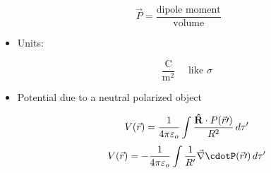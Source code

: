\begin{itemize}
    $$\vec{P}=\frac{\text{dipole moment}}{\text{volume}}$$

    \begin{itemize}

      \item Units:

        $$\frac{\si{\coulomb}}{\si{\meter\squared}}\quad\text{ like }\sigma$$

      \item Potential due to a neutral polarized object

        $$V(\vec{r})=\frac{1}{4\pi\varepsilon_o}\int\frac{\bold{\hat{R}}\cdot P(\vec{r}\prime)}{R^2}\,d\tau'$$
        $$V(\vec{r})=-\frac{1}{4\pi\varepsilon_o}\int\frac{1}{R'}\vec{\nabla}\cdotP(\vec{r}\prime)\,d\tau'$$

    \end{itemize}

\end{itemize}



